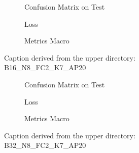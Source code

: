 \begin{figure}
    \centering
    \begin{subfigure}{0.3\linewidth}
        \centering
        
        \caption{Confusion Matrix on Test}
        \label{fig:confMatrixTest-10}
    \end{subfigure}
    \begin{subfigure}{0.3\linewidth}
        \centering
        
        \caption{Loss}
        \label{fig:loss-10}
    \end{subfigure}
    \begin{subfigure}{0.3\linewidth}
        \centering
        
        \caption{Metrics Macro}
        \label{fig:metricsMacro-10}
    \end{subfigure}

    \caption{Caption derived from the upper directory: B16\_N8\_FC2\_K7\_AP20}
    \label{fig:overallCaption-10}
\end{figure}


\begin{figure}
    \centering
    \begin{subfigure}{0.3\linewidth}
        \centering
        
        \caption{Confusion Matrix on Test}
        \label{fig:confMatrixTest-11}
    \end{subfigure}
    \begin{subfigure}{0.3\linewidth}
        \centering
        
        \caption{Loss}
        \label{fig:loss-11}
    \end{subfigure}
    \begin{subfigure}{0.3\linewidth}
        \centering
        
        \caption{Metrics Macro}
        \label{fig:metricsMacro-11}
    \end{subfigure}

    \caption{Caption derived from the upper directory: B32\_N8\_FC2\_K7\_AP20}
    \label{fig:overallCaption-11}
\end{figure}
